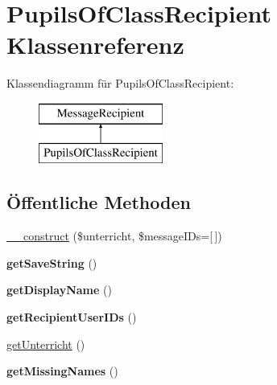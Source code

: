 \hypertarget{class_pupils_of_class_recipient}{}\section{Pupils\+Of\+Class\+Recipient Klassenreferenz}
\label{class_pupils_of_class_recipient}
Klassendiagramm für Pupils\+Of\+Class\+Recipient\+:\begin{figure}[H]
\begin{center}
\leavevmode
\includegraphics[height=2.000000cm]{class_pupils_of_class_recipient}
\end{center}
\end{figure}
\subsection*{Öffentliche Methoden}
\begin{DoxyCompactItemize}
\item 
\mbox{\hyperlink{class_pupils_of_class_recipient_a46ee50b00da193e1a20ed36d226703af}{\+\_\+\+\_\+construct}} (\$unterricht, \$message\+I\+Ds=\mbox{[}$\,$\mbox{]})
\item 
\mbox{\label{class_pupils_of_class_recipient_a94de5e100c6c7ea939fe3e529f04147e}} 
{\bfseries get\+Save\+String} ()
\item 
\mbox{\label{class_pupils_of_class_recipient_a74a816d96568d156f8d592ef93a912b1}} 
{\bfseries get\+Display\+Name} ()
\item 
\mbox{\label{class_pupils_of_class_recipient_a092966803e06b92c67414a644254f84c}} 
{\bfseries get\+Recipient\+User\+I\+Ds} ()
\item 
\mbox{\hyperlink{class_pupils_of_class_recipient_a293fad7179cdf4195e11c3b6952aa84f}{get\+Unterricht}} ()
\item 
\mbox{\label{class_pupils_of_class_recipient_a43bb67752515cc4865fd8d6f50abc680}} 
{\bfseries get\+Missing\+Names} ()
\end{DoxyCompactItemize}
